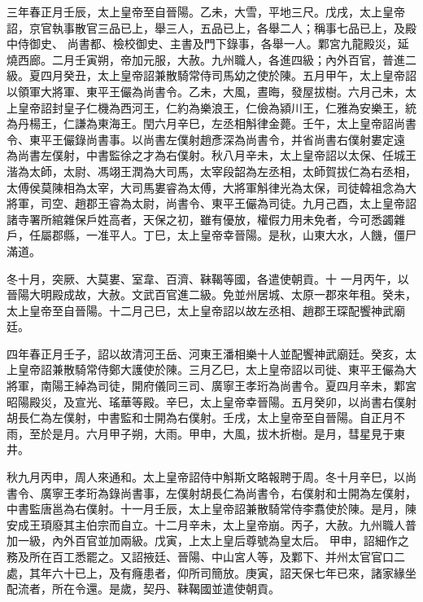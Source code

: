 \begin{pinyinscope}
 三年春正月壬辰，太上皇帝至自晉陽。乙未，大雪，平地三尺。戊戌，太上皇帝詔，京官執事散官三品已上，舉三人，五品已上，各舉二人；稱事七品已上，及殿中侍御史、
 尚書都、檢校御史、主書及門下錄事，各舉一人。鄴宮九龍殿災，延燒西廊。二月壬寅朔，帝加元服，大赦。九州職人，各進四級；內外百官，普進二級。夏四月癸丑，太上皇帝詔兼散騎常侍司馬幼之使於陳。五月甲午，太上皇帝詔以領軍大將軍、東平王儼為尚書令。乙未，大風，晝晦，發屋拔樹。六月己未，太上皇帝詔封皇子仁機為西河王，仁約為樂浪王，仁儉為潁川王，仁雅為安樂王，統為丹楊王，仁謙為東海王。閏六月辛巳，左丞相斛律金薨。壬午，太上皇帝詔尚書令、東平王儼錄尚書事。以尚書左僕射趙彥深為尚書令，并省尚書右僕射婁定遠
 為尚書左僕射，中書監徐之才為右僕射。秋八月辛未，太上皇帝詔以太保、任城王湝為太師，太尉、馮翊王潤為大司馬，太宰段韶為左丞相，太師賀拔仁為右丞相，太傅侯莫陳相為太宰，大司馬婁睿為太傅，大將軍斛律光為太保，司徒韓祖念為大將軍，司空、趙郡王睿為太尉，尚書令、東平王儼為司徒。九月己酉，太上皇帝詔諸寺署所綰雜保戶姓高者，天保之初，雖有優放，權假力用未免者，今可悉蠲雜戶，任屬郡縣，一准平人。丁巳，太上皇帝幸晉陽。是秋，山東大水，人饑，僵尸滿道。



 冬十月，突厥、大莫婁、室韋、百濟、靺鞨等國，各遣使朝貢。十
 一月丙午，以晉陽大明殿成故，大赦。文武百官進二級。免並州居城、太原一郡來年租。癸未，太上皇帝至自晉陽。十二月己巳，太上皇帝詔以故左丞相、趙郡王琛配饗神武廟廷。



 四年春正月壬子，詔以故清河王岳、河東王潘相樂十人並配饗神武廟廷。癸亥，太上皇帝詔兼散騎常侍鄭大護使於陳。三月乙巳，太上皇帝詔以司徙、東平王儼為大將軍，南陽王綽為司徒，開府儀同三司、廣寧王孝珩為尚書令。夏四月辛未，鄴宮昭陽殿災，及宣光、瑤華等殿。辛巳，太上皇帝幸晉陽。五月癸卯，以尚書右僕射
 胡長仁為左僕射，中書監和士開為右僕射。壬戌，太上皇帝至自晉陽。自正月不雨，至於是月。六月甲子朔，大雨。甲申，大風，拔木折樹。是月，彗星見于東井。



 秋九月丙申，周人來通和。太上皇帝詔侍中斛斯文略報聘于周。冬十月辛巳，以尚書令、廣寧王孝珩為錄尚書事，左僕射胡長仁為尚書令，右僕射和士開為左僕射，中書監唐邕為右僕射。十一月壬辰，太上皇帝詔兼散騎常侍李翥使於陳。是月，陳安成王頊廢其主伯宗而自立。十二月辛未，太上皇帝崩。丙子，大赦。九州職人普加一級，內外百官並加兩級。戊寅，上太上皇后尊號為皇太后。
 甲申，詔細作之務及所在百工悉罷之。又詔掖廷、晉陽、中山宮人等，及鄴下、并州太官官口二處，其年六十已上，及有癃患者，仰所司簡放。庚寅，詔天保七年已來，諸家緣坐配流者，所在令還。是歲，契丹、靺鞨國並遣使朝貢。




\end{pinyinscope}
